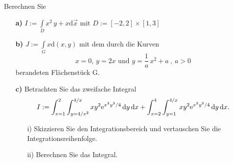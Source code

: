  {
Berechnen Sie 
\begin{itemize}
\item[\textbf{a)}] $	I := \int\limits_D  x^2\,y+x \mathrm{d} \vec x \text{ mit } D := [-2,2]\times[1,3]$
\item[\textbf{b)}] $J:= \int\limits_G x \mathrm{d} (x,y)$ mit dem durch die Kurven \\
$$x=0,\, y=2x \text{ und } y=\frac1a\,x^2+a\ ,\ a>0$$
berandeten Fl\"achenst\"uck G. 
\item[\textbf{c)}] Betrachten Sie das zweifache Integral
$$ I:= \int_{x=1}^2 \int_{y=4/x^2}^{4/x} 
  x y^2 \mathrm{e}^{x^2y^2/4} \, \mathrm{d} y \, \mathrm{d} x + 
  \int_{x=2}^4 \int_{y=1}^{4/x} 
  x y^2 \mathrm{e}^{x^2y^2/4} \, \mathrm{d} y \, \mathrm{d} x. $$
\begin{itemize}
\item[i)] Skizzieren Sie den Integrationsbereich und vertauschen Sie die 
Integrationsreihenfolge.
\item[ii)] Berechnen Sie das Integral.
\end{itemize} 
\end{itemize}
}


